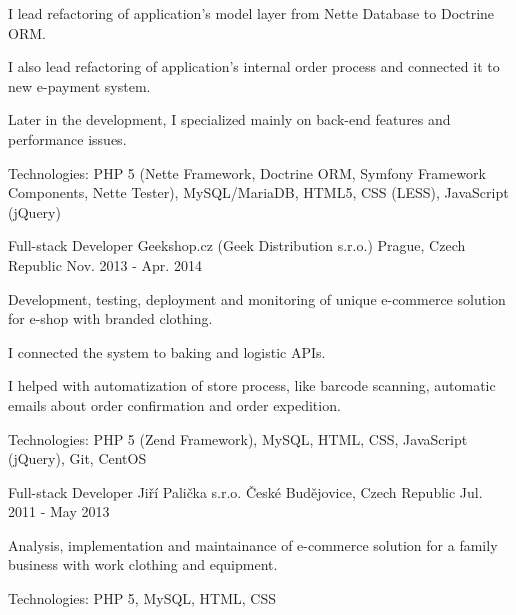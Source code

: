 \begin{cventries}
{\begin{cvitems}
        \item {I lead refactoring of application's model layer from Nette Database to Doctrine ORM.}
        \item {I also lead refactoring of application's internal order process and connected it to new e-payment system.}
        \item {Later in the development, I specialized mainly on back-end features and performance issues.}
        \item {Technologies: PHP 5 (Nette Framework, Doctrine ORM, Symfony Framework Components, Nette Tester), MySQL/MariaDB, HTML5, CSS (LESS), JavaScript (jQuery)}
      \end{cvitems}
    }
  \cventry
    {Full-stack Developer}
    {Geekshop.cz (Geek Distribution s.r.o.)}
    {Prague, Czech Republic}
    {Nov. 2013 - Apr. 2014}
    {
      \begin{cvitems}
        \item {Development, testing, deployment and monitoring of unique e-commerce solution for e-shop with branded clothing.}
        \item {I connected the system to baking and logistic APIs.}
        \item {I helped with automatization of store process, like barcode scanning, automatic emails about order confirmation and order expedition.}
        \item {Technologies: PHP 5 (Zend Framework), MySQL, HTML, CSS, JavaScript (jQuery), Git, CentOS}
      \end{cvitems}
    }
  \cventry
    {Full-stack Developer}
    {Jiří Palička s.r.o.}
    {České Budějovice, Czech Republic}
    {Jul. 2011 - May 2013}
    {
      \begin{cvitems}
        \item {Analysis, implementation and maintainance of e-commerce solution for a family business with work clothing and equipment.}
        \item {Technologies: PHP 5, MySQL, HTML, CSS}
      \end{cvitems}
    }
\end{cventries}
